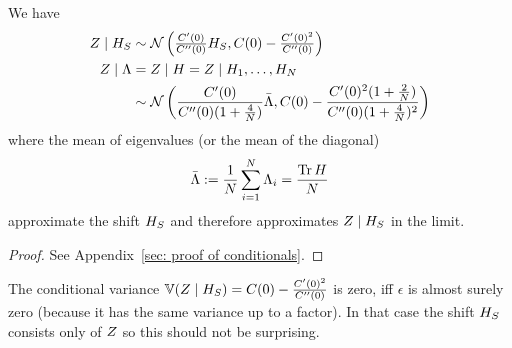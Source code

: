 \begin{theorem}
	\label{thm: conditional distributions of rf}
	We have
	\begin{align}
		Z\mid H_S
		&\sim \mathcal{N}\left(
			\tfrac{C'(0)}{C''(0)} H_S,
			C(0) - \tfrac{C'(0)^2}{C''(0)}
		\right)\\
		Z\mid \Lambda
		&=Z\mid H = Z \mid H_1,\dots, H_N
		\nonumber\\
		&\sim \mathcal{N}\left(
		\frac{C'(0)}{C''(0)(1+\tfrac4{N})}\bar{\Lambda},
		C(0)-\frac{C'(0)^2(1+\tfrac2{N})}{C''(0)(1+\tfrac4{N})^2}
	\right)
	\end{align}
	where the mean of eigenvalues (or the mean of the diagonal)
	\[
		\bar{\Lambda}
		:=\frac1{N}\sum_{i=1}^N \Lambda_i
		=\frac{\operatorname{Tr}{H}}{N}
	\]
	approximate the shift \(H_S\) and therefore approximates \(Z\mid H_S\) in
	the limit.
\end{theorem}
\begin{proof}
	See Appendix~\ref{sec: proof of conditionals}.
\end{proof}
\begin{remark}
	The conditional variance \(\mathbb{V}(Z\mid H_S)= C(0) -
	\tfrac{C'(0)^2}{C''(0)}\) is zero, iff \(\epsilon\) is almost surely
	zero (because it has the same variance up to a factor). In that case the
	shift \(H_S\) consists only of \(Z\) so this should not be surprising.
\end{remark}


